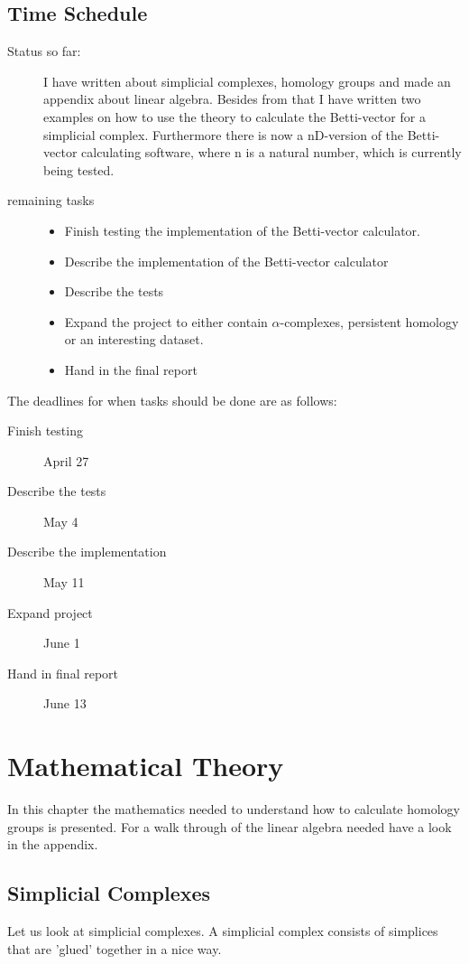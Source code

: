 \documentclass[11pt,a4paper,twoside]{report}
\begin{document}
\section{Time Schedule}
\begin{description}
\item[Status so far:] I have written about simplicial complexes, homology groups and made an appendix about linear algebra. Besides from that I have written two examples on how to use the theory to calculate the Betti-vector for a simplicial complex. Furthermore there is now a nD-version of the Betti-vector calculating software, where n is a natural number, which is currently being tested. 
\item[remaining tasks]
\begin{itemize}
\item Finish testing the implementation of the Betti-vector calculator.
\item Describe the implementation of the Betti-vector calculator
\item Describe the tests
\item Expand the project to either contain $\alpha$-complexes, persistent homology or an interesting dataset.
\item Hand in the final report
\end{itemize}
\end{description}

The deadlines for when tasks should be done are as follows:
\begin{description}
\item[Finish testing]April 27
\item[Describe the tests]May 4
\item[Describe the implementation]May 11
\item[Expand project]June 1
\item[Hand in final report]June 13
\end{description}
\newpage

\chapter{Mathematical Theory}
In this chapter the mathematics needed to understand how to calculate homology groups is presented. For a walk through of the linear algebra needed have a look in the appendix.

\section{Simplicial Complexes}
Let us look at simplicial complexes. A simplicial complex consists of simplices that are 'glued' together in a nice way.
\end{document}
